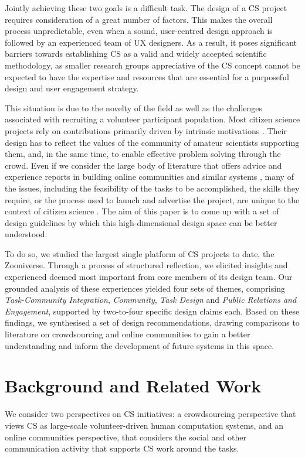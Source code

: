 \documentclass{sigchi}
\begin{document}
\begin{spacing}{0.97}
Jointly achieving these two goals is a difficult task. The design of a CS project requires consideration of a great number of factors. This makes the overall process unpredictable, even when a sound, user-centred design approach is followed by an experienced team of UX designers. As a result, it poses significant barriers towards establishing CS as a valid and widely accepted scientific methodology, as smaller research groups appreciative of the CS concept cannot be expected to have the expertise and resources that are essential for a purposeful design and user engagement strategy. 

This situation is due to the novelty of the field as well as the challenges associated with recruiting a volunteer participant population. Most citizen science projects rely on contributions primarily driven by intrinsic motivations \cite{raddick2010galaxy,Tinati2014}. Their design has to reflect the values of the community of amateur scientists supporting them, and, in the same time, to enable effective problem solving through the crowd. Even if we consider the large body of literature that offers advice and experience reports in building online communities and similar systems \cite{lampe2010motivations,kraut2012building}, many of the issues, including the feasibility of the tasks to be accomplished, the skills they require, or the process used to launch and advertise the project, are unique to the context of citizen science \cite{ebird,druschke2012failures}. The aim of this paper is to come up with a set of design guidelines by which this high-dimensional design space can be better understood. 

To do so, we studied the largest single platform of CS projects to date, the Zooniverse. Through a process of structured reflection, we elicited insights and experienced deemed most important from core members of its design team. Our grounded analysis of these experiences yielded four sets of themes, comprising \emph{Task-Community Integration}, \emph{Community}, \emph{Task Design} and \emph{Public Relations and Engagement}, supported by two-to-four specific design claims each. Based on these findings, we synthesised a set of design recommendations, drawing comparisons to literature on crowdsourcing and online communities to gain a better understanding and inform the development of future systems in this space.

\section{Background and Related Work}
We consider two perspectives on CS initiatives: a crowdsourcing perspective that views CS as large-scale volunteer-driven human computation systems, and an online communities perspective, that considers the social and other communication activity that supports CS work around the tasks.
\\


\end{spacing}
\end{document}
